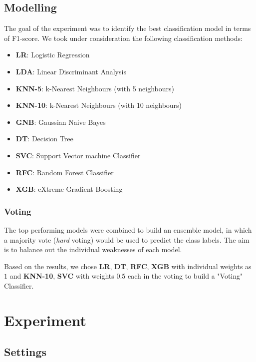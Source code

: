 \documentclass[11pt,a4paper]{article}
\begin{document}
\subsection{Modelling}
\label{sec::pipe_models}
The goal of the experiment was to identify the best classification model in terms of F1-score. We took under consideration the following classification methods:

\begin{itemize}
    \item \textbf{LR}: Logistic Regression 
    \item \textbf{LDA}: Linear Discriminant Analysis \cite{lda}
    \item \textbf{KNN-5}: k-Nearest Neighbours (with 5 neighbours) \cite{knn}
    \item \textbf{KNN-10}: k-Nearest Neighbours (with 10 neighbours)
    \item \textbf{GNB}: Gaussian Naive Bayes
    \item \textbf{DT}: Decision Tree
    \item \textbf{SVC}: Support Vector machine Classifier \cite{svc}
    \item \textbf{RFC}: Random Forest Classifier \cite{rf}
    \item \textbf{XGB}: eXtreme Gradient Boosting \cite{xgboost}
\end{itemize}

\subsubsection{Voting}
The top performing models were combined to build an ensemble model, in which a majority vote (\textit{hard} voting) would be used to predict the class labels. The aim is to balance out the individual weaknesses of each model.

Based on the results, we chose \textbf{LR}, \textbf{DT}, \textbf{RFC}, \textbf{XGB} with individual weights as $1$ and \textbf{KNN-10}, \textbf{SVC} with weights $0.5$ each in the voting to build a "Voting" Classifier.


\section{Experiment}

\subsection{Settings}
\end{document}
